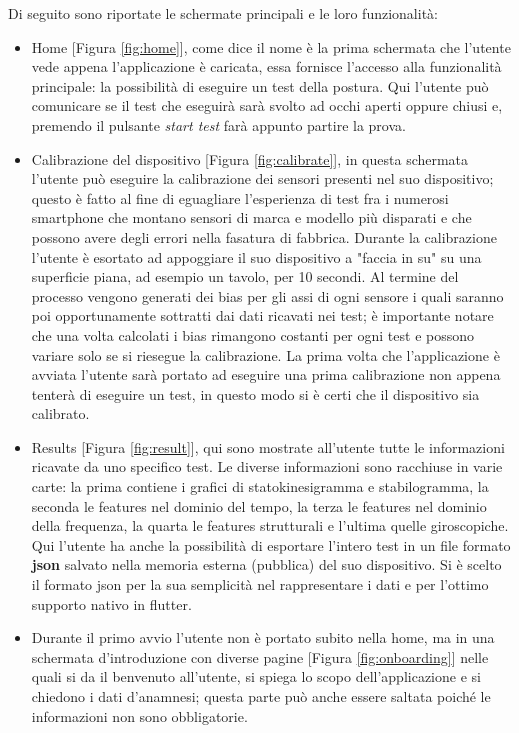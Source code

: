 Di seguito sono riportate le schermate principali e le loro funzionalità:
\begin{itemize}
  \item Home [Figura \ref{fig:home}], come dice il nome è la prima schermata che l'utente vede appena l'applicazione è caricata, essa fornisce l'accesso alla funzionalità principale: la possibilità di eseguire un test della postura. Qui l'utente può comunicare se il test che eseguirà sarà svolto ad occhi aperti oppure chiusi e, premendo il pulsante {\itshape start test} farà appunto partire la prova.

  \item Calibrazione del dispositivo [Figura \ref{fig:calibrate}], in questa schermata l'utente può eseguire la calibrazione dei sensori presenti nel suo dispositivo; questo è fatto al fine di eguagliare l'esperienza di test fra i numerosi smartphone che montano sensori di marca e modello più disparati e che possono avere degli errori nella fasatura di fabbrica.
Durante la calibrazione l'utente è esortato ad appoggiare il suo dispositivo a "faccia in su" su una superficie piana, ad esempio un tavolo, per 10 secondi. Al termine del processo vengono generati dei bias per gli assi di ogni sensore i quali saranno poi opportunamente sottratti dai dati ricavati nei test; è importante notare che una volta calcolati i bias rimangono costanti per ogni test e possono variare solo se si riesegue la calibrazione.
La prima volta che l'applicazione è avviata l'utente sarà portato ad eseguire una prima calibrazione non appena tenterà di eseguire un test, in questo modo si è certi che il dispositivo sia calibrato.

  \item Results [Figura \ref{fig:result}], qui sono mostrate all'utente tutte le informazioni ricavate da uno specifico test.
Le diverse informazioni sono racchiuse in varie carte: la prima contiene i grafici di statokinesigramma e stabilogramma, la seconda le features nel dominio del tempo, la terza le features nel dominio della frequenza, la quarta le features strutturali e l'ultima quelle giroscopiche. Qui l'utente ha anche la possibilità di esportare l'intero test in un file formato {\bfseries json} salvato nella memoria esterna (pubblica) del suo dispositivo. Si è scelto il formato json per la sua semplicità nel rappresentare i dati e per l'ottimo supporto nativo in flutter.

  \item Durante il primo avvio l'utente non è portato subito nella home, ma in una schermata d'introduzione con diverse pagine [Figura \ref{fig:onboarding}] nelle quali si da il benvenuto all'utente, si spiega lo scopo dell'applicazione e si chiedono i dati d'anamnesi; questa parte può anche essere saltata poiché le informazioni non sono obbligatorie.
\end{itemize}

